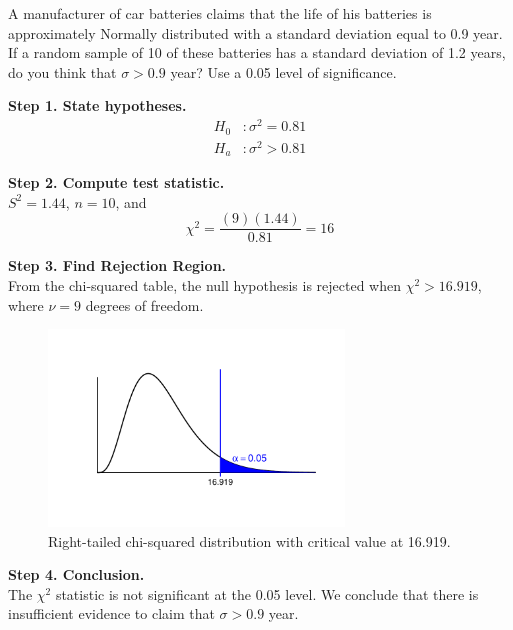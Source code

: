 \begin{example}
A manufacturer of car batteries claims that the life of his batteries is approximately Normally distributed with a standard deviation equal to 0.9 year. If a random sample of 10 of these batteries has a standard deviation of 1.2 years, do you think that $\sigma > 0.9$ year? Use a 0.05 level of significance.

\textbf{Step 1. State hypotheses.}
\begin{align*}
H_0 &: \sigma^2 = 0.81 \\
H_a &: \sigma^2 > 0.81
\end{align*}

\textbf{Step 2. Compute test statistic.} \\
$S^2 = 1.44$, $n = 10$, and
\[
\chi^2 = \frac{(9)(1.44)}{0.81} = 16
\]

\textbf{Step 3. Find Rejection Region.} \\
From the chi-squared table, the null hypothesis is rejected when $\chi^2 > 16.919$, where $\nu = 9$ degrees of freedom.
\begin{figure}[H]
\centering
\includegraphics[width=0.70\textwidth]{section11/images/chisq_right_tail.pdf} 
\vspace{-3em} %
\captionsetup{skip=0pt}
\caption{Right-tailed chi-squared distribution with critical value at 16.919.}
\end{figure}

\textbf{Step 4. Conclusion.} \\
The $\chi^2$ statistic is not significant at the 0.05 level. We conclude that there is insufficient evidence to claim that $\sigma > 0.9$ year.
\end{example}
















